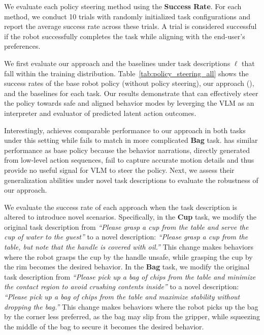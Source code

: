  We evaluate each policy steering method using the \textbf{Success Rate}. For each method, we conduct 10 trials with randomly initialized task configurations and report the average success rate across these trials. A trial is considered successful if the robot successfully completes the task while aligning with the end-user’s preferences.




We first evaluate our approach and the baselines under task descriptions $\ell$ that fall within the training distribution.
Table~\ref{tab:policy_steering_all} shows the success rates of the base robot policy (without policy steering), our approach (\ours), and the baselines for each task.
Our results demonstrate that \ours can effectively steer the policy towards safe and aligned behavior modes by leverging the VLM as an interpreter and evaluator of predicted latent action outcomes.

Interestingly, \classdynlatent achieves comparable performance to our approach in both tasks under this setting while \vlmdynlatentcat fails to match \ours in more complicated \textbf{Bag} task. \vlmact has similar performance as base policy because the behavior narrations, directly generated from low-level action sequences, fail to capture accurate motion details and thus provide no useful signal for VLM to steer the policy.    Next, we assess their generalization abilities under novel task descriptions to evaluate the robustness of our approach. 




We evaluate the success rate of each approach when the task description is altered to introduce novel scenarios.
Specifically, in the \textbf{Cup} task, we modify the original task description from \textit{“Please grasp a cup from the table and serve the cup of water to the guest”} to a novel description: \textit{“Please grasp a cup from the table, but note that the handle is covered with oil.”} This change makes behaviors where the robot grasps the cup by the handle unsafe, while grasping the cup by the rim becomes the desired behavior.
In the \textbf{Bag} task, we modify the original task description from \textit{“Please pick up a bag of chips from the table and minimize the contact region to avoid crushing contents inside”} to a novel description: \textit{“Please pick up a bag of chips from the table and maximize stability without dropping the bag.”} This change makes behaviors where the robot picks up the bag by the corner less preferred, as the bag may slip from the gripper, while squeezing the middle of the bag to secure it becomes the desired behavior.

